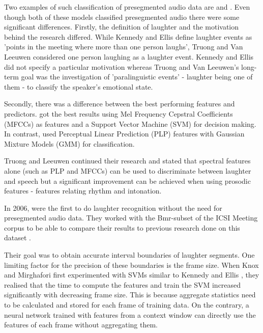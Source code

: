 \documentclass[bsc,frontabs,parskip,deptreport]{infthesis}
\begin{document}
Two examples of such classification of presegmented audio data are \citeauthor{kennedy2004laughter} and \citeauthor{truong2005automatic}. 
Even though both of these models classified presegmented audio there were some significant differences. 
Firstly, the definition of laughter and the motivation behind the research differed.
While Kennedy and Ellis define laughter events as 'points in the meeting where more than one person laughs', Truong and Van Leeuwen considered one person laughing as a laughter event.
Kennedy and Ellis did not specify a particular motivation whereas Truong and Van Leeuwen's long-term goal was the investigation of 'paralinguistic events' - laughter being one of them - to classify the speaker's emotional state.   

Secondly, there was a difference between the best performing features and predictors.  
\citeauthor{kennedy2004laughter} got the best results using Mel Frequency Cepstral Coefficients (MFCCs) as features and a Support Vector Machine (SVM) for decision making. 
In contrast, \citeauthor{truong2005automatic} used Perceptual Linear Prediction (PLP) features with Gaussian Mixture Models (GMM) for classification. 

Truong and Leeuwen  continued their research \citep{truong2007automatic} and stated that spectral features alone (such as PLP and MFCCs) can be used to discriminate between laughter and speech but a significant improvement can be achieved when using prosodic features - features relating rhythm and intonation.

In 2006, \citeauthor{knox2006automatic} were the first to do laughter recognition without the need for presegmented audio data.  
They worked with the Bmr-subset of the ICSI Meeting corpus \citep{morgan2001meeting} to be able to compare their results to previous research done on this dataset \citep{kennedy2004laughter, truong2005automatic, truong2007automatic}.

Their goal was to obtain accurate interval boundaries of laughter segments.
One limiting factor for the precision of these boundaries is the frame size. 
When Knox and Mirghafori first experimented with SVMs similar to Kennedy and Ellis \citep{kennedy2004laughter}, they realised that the time to compute the features and train the SVM increased significantly with decreasing frame size. 
This is because aggregate statistics need to be calculated and stored for each frame of training data.  
On the contrary, a neural network trained with features from a context window can directly use the features of each frame without aggregating them.  
\end{document}
